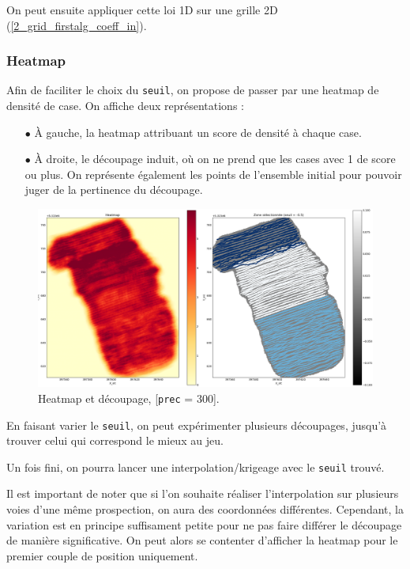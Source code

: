 \documentclass[12pt]{article}
\begin{document}
    \label{2_grid_firstalg_coeff_out} On peut ensuite appliquer cette loi 1D sur une grille 2D (\ref{2_grid_firstalg_coeff_in}).

\subsubsection{Heatmap}

    Afin de faciliter le choix du \texttt{seuil}, on propose de passer par une heatmap de densité de case. On affiche deux représentations :

    \begin{enumerate}
        \item[$\bullet$] À gauche, la heatmap attribuant un score de densité à chaque case.
        \item[$\bullet$] À droite, le découpage induit, où on ne prend que les cases avec 1 de score ou plus. On représente également les points de l'ensemble initial pour pouvoir juger de la pertinence du découpage.
    \end{enumerate}

    \begin{figure}[ht!]
        \centering
        \includegraphics[width=\textwidth]{Images/Grid_Heatmap_p300.png}
        \caption{Heatmap et découpage, [\texttt{prec} = 300].}
    \end{figure}
    
    En faisant varier le \texttt{seuil}, on peut expérimenter plusieurs découpages, jusqu'à trouver celui qui correspond le mieux au jeu.

    Un fois fini, on pourra lancer une interpolation/krigeage avec le \texttt{seuil} trouvé.

    Il est important de noter que si l'on souhaite réaliser l'interpolation sur plusieurs voies d'une même prospection, on aura des coordonnées différentes. Cependant, la variation est en principe suffisament petite pour ne pas faire différer le découpage de manière significative. On peut alors se contenter d'afficher la heatmap pour le premier couple de position uniquement.
\end{document}
